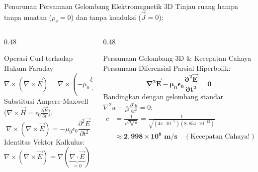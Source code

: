 \documentclass[aspectratio=169,10pt]{beamer}
\begin{document}
\begin{frame}{Penurunan Persamaan Gelombang Elektromagnetik 3D}
  Tinjau ruang hampa tanpa muatan ($\rho_v = 0$) dan tanpa konduksi ($\vec{J} = 0$):
  \vspace{-0.1cm}
  \begin{columns}[t]
    \begin{column}{0.48\textwidth}
      \begin{block}{Operasi Curl terhadap Hukum Faraday}
        \small
        \begin{equation*}
          \nabla \times (\nabla \times \vec{E}) = \nabla \times \left(-\mu_0 \frac{\partial \vec{H}}{\partial t}\right) = -\mu_0 \frac{\partial}{\partial t}(\nabla \times \vec{H})
        \end{equation*}
        Substitusi Ampere-Maxwell ($\nabla \times \vec{H} = \epsilon_0 \frac{\partial \vec{E}}{\partial t}$):
        \begin{equation*}
          \nabla \times (\nabla \times \vec{E}) = -\mu_0 \epsilon_0 \frac{\partial^2 \vec{E}}{\partial t^2}
        \end{equation*}
        Identitas Vektor Kalkulus:
        \begin{equation*}
          \nabla \times (\nabla \times \vec{E}) = \nabla(\underbrace{\nabla \cdot \vec{E}}_{=0}) - \nabla^2 \vec{E} = -\nabla^2 \vec{E}
        \end{equation*}
      \end{block}
    \end{column}
    \begin{column}{0.48\textwidth}
      \begin{alertblock}{Persamaan Gelombang 3D \& Kecepatan Cahaya}
        \small
        Persamaan Diferensial Parsial Hiperbolik:
        \begin{equation*}
          \mathbf{\nabla^2 \vec{E} - \mu_0 \epsilon_0 \frac{\partial^2 \vec{E}}{\partial t^2} = 0}
        \end{equation*}
        Bandingkan dengan gelombang standar $\nabla^2 u - \frac{1}{v^2}\frac{\partial^2 u}{\partial t^2} = 0$:
        \begin{align*}
          c &= \frac{1}{\sqrt{\mu_0 \epsilon_0}} = \frac{1}{\sqrt{(4\pi \cdot 10^{-7})(8{,}854 \cdot 10^{-12})}} \\
            &\approx \mathbf{2{,}998 \times 10^8\text{ m/s}} \quad (\text{Kecepatan Cahaya!})
        \end{align*}
      \end{alertblock}
    \end{column}
  \end{columns}
\end{frame}
\end{document}
